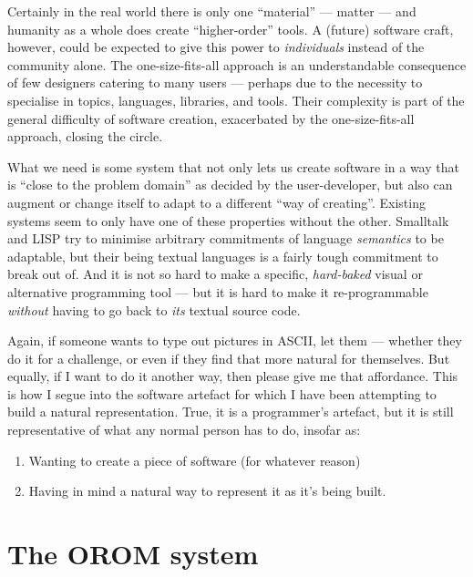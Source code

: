 \documentclass[english,submission]{programming}
\providecommand{\tightlist}{%
  \setlength{\itemsep}{0pt}\setlength{\parskip}{0pt}}
\begin{document}
  Certainly in the real world there is only one ``material'' --- matter
  --- and humanity as a whole does create ``higher-order'' tools. A
  (future) software craft, however, could be expected to give this power
  to \emph{individuals} instead of the community alone. The
  one-size-fits-all approach is an understandable consequence of few
  designers catering to many users --- perhaps due to the necessity to
  specialise in topics, languages, libraries, and tools. Their complexity
  is part of the general difficulty of software creation, exacerbated by
  the one-size-fits-all approach, closing the circle.

  What we need is some system that not only lets us create software in a
  way that is ``close to the problem domain'' as decided by the
  user-developer, but also can augment or change itself to adapt to a
  different ``way of creating''. Existing systems seem to only have one of
  these properties without the other. Smalltalk and LISP try to minimise
  arbitrary commitments of language \emph{semantics} to be adaptable, but
  their being textual languages is a fairly tough commitment to break out
  of. And it is not so hard to make a specific, \emph{hard-baked} visual
  or alternative programming tool --- but it is hard to make it
  re-programmable \emph{without} having to go back to \emph{its} textual
  source code.

  Again, if someone wants to type out pictures in ASCII, let them ---
  whether they do it for a challenge, or even if they find that more
  natural for themselves. But equally, if I want to do it another way,
  then please give me that affordance. This is how I segue into the
  software artefact for which I have been attempting to build a natural
  representation. True, it is a programmer's artefact, but it is still
  representative of what any normal person has to do, insofar as:

  \begin{enumerate}
  \def\labelenumi{\alph{enumi})}
  \tightlist
  \item
    Wanting to create a piece of software (for whatever reason)
  \item
    Having in mind a natural way to represent it as it's being built.
  \end{enumerate}

  \hypertarget{the-orom-system}{%
  \section{The OROM system}\label{the-orom-system}}
\end{document}
